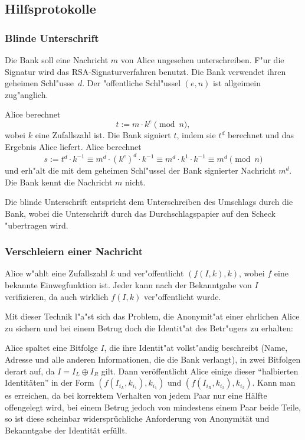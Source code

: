 \subsection{Hilfsprotokolle}

\subsubsection*{Blinde Unterschrift}

Die Bank soll eine Nachricht $m$ von Alice ungesehen
unterschreiben. F"ur die Signatur wird das RSA-Signaturverfahren
benutzt. Die Bank verwendet ihren geheimen Schl"usse~$d$. Der
"offentliche Schl"ussel $(e,n)$ ist allgeimein zug"anglich.

Alice berechnet 
$$ t := m \cdot k^e \pmod{n},$$
wobei $k$ eine Zufallszahl ist.
Die Bank signiert $t$, indem sie $t^d$ berechnet und das Ergebnis
Alice liefert. Alice berechnet
$$ s := t^d \cdot k^{-1} \equiv m^d \cdot (k^e)^d \cdot k^{-1}
   \equiv m^{d} \cdot k^1 \cdot k^{-1} \equiv m^d \pmod{n} $$
und erh"alt die mit dem geheimen Schl"ussel der Bank signierter
Nachricht $m^d$. Die Bank kennt die Nachricht $m$ nicht.

Die blinde Unterschrift entspricht dem Unterschreiben des Umschlags
durch die Bank, wobei die Unterschrift durch das Durchschlagspapier
auf den Scheck "ubertragen wird.


\subsubsection*{Verschleiern einer Nachricht}

Alice w"ahlt eine Zufallszahl $k$ und ver"offentlicht $(f(I,k),k)$,
wobei $f$ eine bekannte Einwegfunktion ist. Jeder kann nach der
Bekanntgabe von $I$ verifizieren, da\3 auch wirklich $f(I,k)$
ver"offentlicht wurde.

Mit dieser Technik l"a"st sich das Problem, die Anonymit"at einer
ehrlichen Alice zu sichern und bei einem Betrug doch die Identit"at
des Betr"ugers zu erhalten:

Alice spaltet eine Bitfolge $I$, die ihre Identit"at vollst"andig
beschreibt (Name, Adresse und alle anderen Informationen, die die Bank
verlangt), in zwei Bitfolgen derart auf, da\3 $I = I_L \oplus I_R$ gilt.
Dann ver\"offentlicht Alice einige dieser "`halbierten Identit\"aten"' in der Form
$\left(f\left(I_{i_L},k_{i_1}\right),k_{i_1}\right)$ und
$\left(f\left(I_{i_R},k_{i_2}\right),k_{i_2}\right)$.
Kann man es erreichen, da\3 bei korrektem Verhalten von jedem Paar nur
eine H\"alfte offengelegt wird, bei einem Betrug jedoch von mindestens
einem Paar beide Teile, so ist diese scheinbar widerspr\"uchliche
Anforderung von Anonymit\"at und Bekanntgabe der Identit\"at
erf\"ullt.



